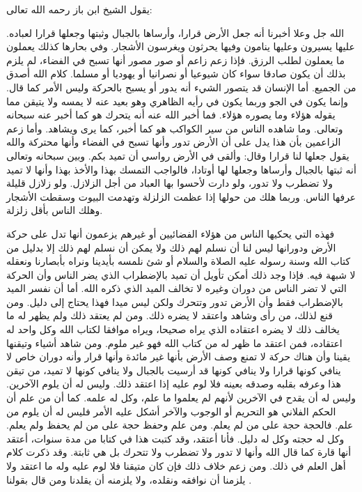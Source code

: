 يقول الشيخ ابن باز رحمه الله تعالى:

الله جل وعلا أخبرنا أنه جعل الأرض قرارا، وأرساها بالجبال وثبتها وجعلها قرارا لعباده. عليها يسيرون وعليها ينامون وفيها يحرثون ويغرسون الأشجار. وفي بحارها كذلك يعملون ما يعملون لطلب الرزق. فإذا زعم زاعم أو صور مصور أنها تسبح في الفضاء، لم يلزم بذلك أن يكون صادقا سواء كان شيوعيا أو نصرانيا أو يهوديا أو مسلما. كلام الله أصدق من الجميع. أما الإنسان قد يتصور الشيء أنه يدور أو يسبح بالحركة وليس الأمر كما قال. وإنما يكون في الجو وربما يكون في رأيه الظاهري وهو بعيد عنه لا يمسه ولا يتيقن مما يقوله هؤلاء وما يصوره هؤلاء. فما أخبر الله عنه أنه يتحرك هو كما أخبر عنه سبحانه وتعالى. وما شاهده الناس من سير الكواكب هو كما أخبر، كما يرى ويشاهد. وأما زعم الزاعمين بأن هذا يدل على أن الأرض تدور وأنها تسبح في الفضاء وأنها محتركة والله يقول جعلها لنا قرارا وقال: وألقى في الأرض رواسي أن تميد بكم. وبين سبحانه وتعالى أنه ثبتها بالجبال وأرساها وجعلها لها أوتادا، فالواجب التمسك بهذا والأخذ بهذا وأنها لا تميد ولا تضطرب ولا تدور، ولو دارت لأحسوا بها العباد من أجل الزلازل. ولو زلازل قليلة عرفها الناس. وربما هلك من حولها إذا عظمت الزلزلة وتهدمت البيوت وسقطت الأشجار وهلك الناس بأقل زلزلة. 

فهذه التي يحكيها الناس من هؤلاء الفضائيين أو غيرهم يزعمون أنها تدل على حركة الأرض ودورانها ليس لنا أن نسلم لهم ذلك ولا يمكن أن نسلم لهم ذلك إلا بدليل من كتاب الله وسنة رسوله عليه الصلاة والسلام أو شئ نلمسه بأيدينا ونراه بأبصارنا ونعقله لا شبهة فيه. فإذا وجد  ذلك أمكن تأويل أن تميد بالإضطراب الذي يضر الناس وأن الحركة التي لا تضر الناس من دوران وغيره لا تخالف الميد الذي ذكره الله. أما أن نفسر الميد بالإضطراب فقط وأن الأرض تدور وتتحرك ولكن ليس ميدا فهذا يحتاج إلى دليل. ومن قنع لذلك، من رأى وشاهد واعتقد لا يضره ذلك. ومن لم يعتقد ذلك ولم يظهر له ما يخالف ذلك لا يضره اعتقاده الذي يراه صحيحا، ويراه موافقا لكتاب الله وكل واحد له اعتقاده، فمن اعتقد ما ظهر له من كتاب الله فهو غير ملوم. ومن شاهد أشياء وتيقنها يقينا وأن هناك حركة لا تمنع وصف الأرض بأنها غير مائدة وأنها قرار وأنه دوران خاص لا ينافي كونها قرارا ولا ينافي كونها قد أرسيت بالجبال ولا ينافي كونها لا تميد، من تيقن هذا وعرفه بقلبه وصدقه بعينه فلا لوم عليه إذا اعتقد ذلك. وليس له أن يلوم الآخرين. وليس له أن يقدح في الآخرين لأنهم لم يعلموا ما علم، وكل له علمه. كما أن من علم أن الحكم الفلاني هو التحريم أو الوجوب والآخر أشكل عليه الأمر فليس له أن يلوم من علم. فالحجة حجة على من لم يعلم. ومن علم وحفظ حجة على من لم يحفظ ولم يعلم. وكل له حجته وكل له دليل. فأنا أعتقد، وقد كتبت هذا في كتابا من مدة سنوات، أعتقد أنها قارة كما قال الله وأنها لا تدور ولا تضطرب ولا تتحرك بل هي ثابتة. وقد ذكرت كلام أهل العلم في ذلك. ومن زعم خلاف ذلك فإن كان متيقنا فلا لوم عليه وله ما اعتقد ولا يلزمنا أن نوافقه ونقلده، ولا يلزمنه أن يقلدنا ومن قال بقولنا \href{https://www.youtube.com/watch?v=nbzh7p2ZlFQ}{\faExternalLink}. 


